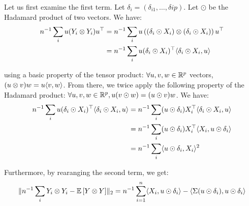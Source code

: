 \documentclass{article}
\numberwithin{equation}{section}
\begin{document}
Let us first examine the first term. Let $\delta_i = (\delta_{i1}, \dots, \delta{ip})$. Let $\odot$ be the Hadamard product of two vectors. We have:
\begin{equation*}
    \begin{split}
    n^{-1}\sum_i u (Y_i\otimes Y_i)u^\top &= n^{-1}\sum_i u \left( (\delta_i \odot X_i)\otimes (\delta_i \odot X_i)\right)u^\top\\
    &= n^{-1}\sum_i u (\delta_i \odot X_i)^\top \langle \delta_i \odot X_i , u \rangle
    \end{split}
\end{equation*}

using a basic property of the tensor product: $\forall u,v,w \in \mathbb{R}^p$ vectors, $(u\otimes v)w = u\langle v , w \rangle$. From there, we twice apply the following property of the Hadamard product: $\forall u,v,w\in \mathbb{R}^p, u(v\odot w) = (u\odot v) w$. We have:
\begin{equation*}
    \begin{split}
    n^{-1}\sum_i u (\delta_i \odot X_i)^\top \langle \delta_i \odot X_i , u \rangle &= n^{-1} \sum_i (u \odot \delta_i) X_i^\top \langle \delta_i \odot X_i , u \rangle\\
    &= n^{-1} \sum_i (u \odot \delta_i) X_i^\top \langle X_i , u\odot \delta_i \rangle\\
    &= n^{-1} \sum_i \langle u\odot \delta_i , X_i \rangle^2
    \end{split}
\end{equation*}

Furthermore, by rearanging the second term, we get:
\begin{equation*}
    \lVert n^{-1}\sum_i Y_i\otimes Y_i - \mathbb{E}\left[ Y\otimes Y\right] \rVert_2 = n^{-1} \sum_{i=1}^n \langle X_i , u\odot \delta_i \rangle - \langle \Sigma (u\odot \delta_i) , u \odot \delta_i \rangle
\end{equation*}
\end{document}
